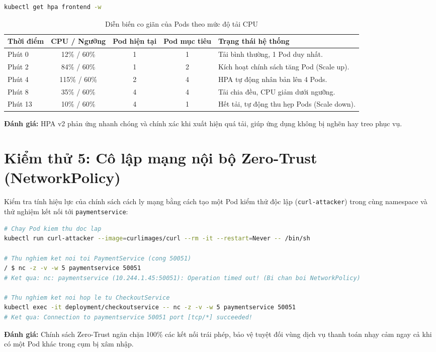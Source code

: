 \begin{lstlisting}[language=bash, caption={Theo dõi tiến trình co giãn tự động của Pod qua HPA}]
kubectl get hpa frontend -w
\end{lstlisting}

\begin{table}[H]
    \centering
    \small
    \renewcommand{\arraystretch}{1.25}
    \caption{Diễn biến co giãn của Pods theo mức độ tải CPU}
    \label{tab:hpa_test}
    \begin{tabularx}{\textwidth}{l c c c X}
        \toprule
        \textbf{Thời điểm} & \textbf{CPU / Ngưỡng} & \textbf{Pod hiện tại} & \textbf{Pod mục tiêu} & \textbf{Trạng thái hệ thống} \\
        \midrule
        Phút 0 & 12\% / 60\% & 1 & 1 & Tải bình thường, 1 Pod duy nhất. \\
        Phút 2 & 84\% / 60\% & 1 & 2 & Kích hoạt chính sách tăng Pod (Scale up). \\
        Phút 4 & 115\% / 60\% & 2 & 4 & HPA tự động nhân bản lên 4 Pods. \\
        Phút 8 & 35\% / 60\% & 4 & 4 & Tải chia đều, CPU giảm dưới ngưỡng. \\
        Phút 13 & 10\% / 60\% & 4 & 1 & Hết tải, tự động thu hẹp Pods (Scale down). \\
        \bottomrule
    \end{tabularx}
\end{table}
\noindent \textbf{Đánh giá:} HPA v2 phản ứng nhanh chóng và chính xác khi xuất hiện quá tải, giúp ứng dụng không bị nghẽn hay treo phục vụ.

\section{Kiểm thử 5: Cô lập mạng nội bộ Zero-Trust (NetworkPolicy)}
Kiểm tra tính hiệu lực của chính sách cách ly mạng bằng cách tạo một Pod kiểm thử độc lập (\texttt{curl-attacker}) trong cùng namespace và thử nghiệm kết nối tới \texttt{paymentservice}:

\begin{lstlisting}[language=bash, caption={Kiểm thử tấn công di chuyển ngang tới cổng thanh toán}]
# Chay Pod kiem thu doc lap
kubectl run curl-attacker --image=curlimages/curl --rm -it --restart=Never -- /bin/sh

# Thu nghiem ket noi toi PaymentService (cong 50051)
/ $ nc -z -v -w 5 paymentservice 50051
# Ket qua: nc: paymentservice (10.244.1.45:50051): Operation timed out! (Bi chan boi NetworkPolicy)

# Thu nghiem ket noi hop le tu CheckoutService
kubectl exec -it deployment/checkoutservice -- nc -z -v -w 5 paymentservice 50051
# Ket qua: Connection to paymentservice 50051 port [tcp/*] succeeded!
\end{lstlisting}

\noindent \textbf{Đánh giá:} Chính sách Zero-Trust ngăn chặn 100\% các kết nối trái phép, bảo vệ tuyệt đối vùng dịch vụ thanh toán nhạy cảm ngay cả khi có một Pod khác trong cụm bị xâm nhập.
